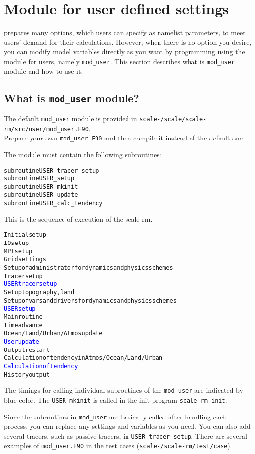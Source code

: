 \section{Module for user defined settings} \label{sec:mod_user}

\scalerm prepares many options, which users can specify as namelist parameters, to meet users' demand for their calculations.
However, when there is no option you desire,
you can modify model variables directly as you want by programming using the module for users, namely \verb|mod_user|.
This section describes what is \verb|mod_user| module and how to use it.


\subsection{What is \texttt{mod\_user} module?}

The default \verb|mod_user| module is provided in \texttt{scale-{\version}/scale/scale-rm/src/user/mod\_user.F90}.\\
Prepare your own \verb|mod_user.F90| and then compile it instead of the default one.

The module must contain the following subroutines:
\begin{alltt}
  subroutine USER_tracer_setup
  subroutine USER_setup
  subroutine USER_mkinit
  subroutine USER_update
  subroutine USER_calc_tendency
\end{alltt}

\noindent This is the sequence of execution of the scale-rm.
\begin{alltt}
Initial setup
  IO setup
  MPI setup
  Grid settings
  Setup of administrator for dynamics and physics schemes 
  Tracer setup
  \textcolor{blue}{USER tracer setup}
  Setup topography, land
  Setup of vars and drivers for dynamics and physics schemes 
  \textcolor{blue}{USER setup}
Main routine
  Time advance
  Ocean/Land/Urban/Atmos update
  \textcolor{blue}{User update}
  Output restart
  Calculation of tendency in Atmos/Ocean/Land/Urban
  \textcolor{blue}{Calculation of tendency}
  History output
\end{alltt}
The timings for calling individual subroutines of the \verb|mod_user| are indicated by blue color.
The \verb|USER_mkinit| is called in the init program \verb|scale-rm_init|.


Since the subroutines in \verb|mod_user| are basically called after handling each process,
you can replace any settings and variables as you need.
You can also add several tracers, such as passive tracers, in \verb|USER_tracer_setup|.
There are several examples of \verb|mod_user.F90| in the test cases (\texttt{scale-{\version}/scale-rm/test/case}).


